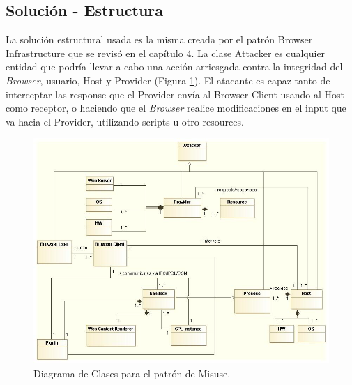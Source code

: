 \subsection{Solución - Estructura}
La solución estructural usada es la misma creada por el patrón Browser Infrastructure que se revisó en el capítulo 4. La clase Attacker es cualquier entidad que podría llevar a cabo una acción arriesgada contra la integridad del \textit{Browser}, usuario, Host y Provider (Figura \ref{fig:BIMisuse}). El atacante es capaz tanto de interceptar las response que el Provider envía al Browser Client usando al Host como receptor, o haciendo que el \textit{Browser} realice modificaciones en el input que va hacia el Provider, utilizando scripts u otro resources.
\begin{landscape}
\begin{figure}[h!t]
	        \centering
	        \includegraphics[scale=0.62]{figures/chap5/patronMisuse_v2.jpg}
	        \caption{Diagrama de Clases para el patrón de Misuse.}
	        \label{fig:BIMisuse}
    \end{figure}
\end{landscape}

